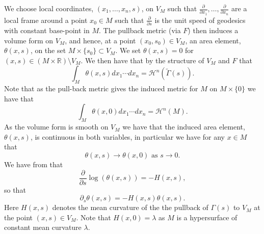 \documentclass[11pt]{article}
\begin{document}
We choose local coordinates, $(x_1, \dots, x_n,s)$, on $V_{M}$ such that $\frac{\partial}{\partial x_1}, \dots, \frac{\partial}{\partial x_n}$ are a local frame around a point $x_0 \in M$ such that $\frac{\partial}{\partial s}$ is the unit speed of geodesics with constant base-point in $M$. The pullback metric (via $F$) then induces a volume form on $V_{M}$, and hence, at a point $(x_0,s_0) \in V_{M}$, an area element, $\theta(x,s)$, on the set $M \times \{s_0\} \subset V_{M}$. We set $\theta(x,s) = 0$ for $(x,s) \in (M \times \mathbb{R}) \setminus V_M$. We then have that by the structure of $V_M$ and $F$ that
\begin{equation}\label{eqn: integral of area element is good part of level set}
    \int_{M} \theta(x,s) dx_1\cdots dx_n = \mathcal{H}^n(\widetilde{\Gamma}(s)).
\end{equation}
Note that as the pull-back metric gives the induced metric for $M$ on $M \times \{0\}$ we have that
\begin{equation*}
    \int_{M} \theta(x,0) dx_1\cdots dx_n = \mathcal{H}^n(M).
\end{equation*}
As the volume form is smooth on $V_{M}$ we have that the induced area element, $\theta(x,s)$, is continuous in both variables, in particular we have for any $x \in M$ that
\begin{equation}\label{eqn: aream elements converge back to 0}
    \theta(x,s) \rightarrow \theta(x,0) \text{ as } s \rightarrow 0.
\end{equation}
We have from \cite[Theorem 3.11.]{tubes} that
\begin{equation}\label{eqn: differential equation for area elements log form}
    \frac{\partial}{\partial s} \log( \theta(x,s)) = -H(x,s),
\end{equation}
so that
\begin{equation}\label{eqn: differential equation for area elements}
    \partial_s \theta(x,s) = -H(x,s)\theta(x,s).
\end{equation}
Here $H(x,s)$ denotes the mean curvature of the the pullback of $\Gamma(s)$ to $V_{M}$ at the point $(x,s) \in V_{M}$. Note that $H(x,0) = \lambda$ as $M$ is a hypersurface of constant mean curvature $\lambda$.

\bigskip
\end{document}
